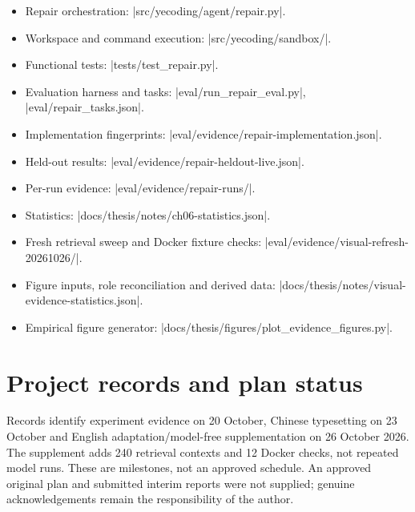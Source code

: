 \begin{itemize}
\tightlist
\item
  Repair orchestration: \code|src/yecoding/agent/repair.py|.
\item
  Workspace and command execution: \code|src/yecoding/sandbox/|.
\item
  Functional tests: \code|tests/test_repair.py|.
\item
  Evaluation harness and tasks: \code|eval/run_repair_eval.py|, \code|eval/repair_tasks.json|.
\item
  Implementation fingerprints: \code|eval/evidence/repair-implementation.json|.
\item
  Held-out results: \code|eval/evidence/repair-heldout-live.json|.
\item
  Per-run evidence: \code|eval/evidence/repair-runs/|.
\item
  Statistics: \code|docs/thesis/notes/ch06-statistics.json|.
\item
  Fresh retrieval sweep and Docker fixture checks: \code|eval/evidence/visual-refresh-20261026/|.
\item
  Figure inputs, role reconciliation and derived data: \code|docs/thesis/notes/visual-evidence-statistics.json|.
\item
  Empirical figure generator: \code|docs/thesis/figures/plot_evidence_figures.py|.
\end{itemize}

\section{Project records and plan status}\label{project-records-and-plan-status}

Records identify experiment evidence on 20 October, Chinese typesetting on 23 October and English adaptation/model-free supplementation on 26 October 2026. The supplement adds 240 retrieval contexts and 12 Docker checks, not repeated model runs. These are milestones, not an approved schedule. An approved original plan and submitted interim reports were not supplied; genuine acknowledgements remain the responsibility of the author.
